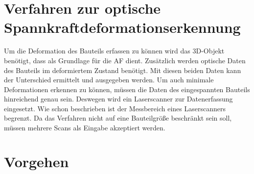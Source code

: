 \section{Verfahren zur optische Spannkraftdeformationserkennung}

Um die Deformation des Bauteils erfassen zu können wird das 3D-Objekt benötigt, 
dass als Grundlage für die AF dient. Zusätzlich werden optische Daten des Bauteils 
im deformiertem Zustand benötigt. Mit diesen beiden Daten kann der Unterschied 
ermittelt und ausgegeben werden.
Um auch minimale Deformationen erkennen zu können, müssen die Daten des 
eingespannten Bauteils hinreichend genau sein. Deswegen wird ein Laserscanner zur 
Datenerfassung eingesetzt.
Wie schon beschrieben ist der Messbereich eines Laserscanners begrenzt. Da das 
Verfahren nicht auf eine Bauteilgröße beschränkt sein soll, müssen mehrere Scans als 
Eingabe akzeptiert werden.

\section{Vorgehen}

